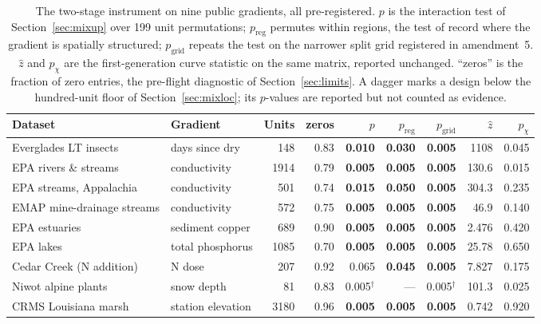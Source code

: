 \begin{table}[t]
\centering
\caption{The two-stage instrument on nine public gradients, all pre-registered. $p$ is the interaction test of Section~\ref{sec:mixup} over 199 unit permutations; $p_{\text{reg}}$ permutes within regions, the test of record where the gradient is spatially structured; $p_{\text{grid}}$ repeats the test on the narrower split grid registered in amendment~5. $\hat z$ and $p_\chi$ are the first-generation curve statistic on the same matrix, reported unchanged. ``zeros'' is the fraction of zero entries, the pre-flight diagnostic of Section~\ref{sec:limits}. A dagger marks a design below the hundred-unit floor of Section~\ref{sec:mixloc}; its $p$-values are reported but not counted as evidence.}
\label{tab:program}
\small
\begin{tabular}{llrrrrrrr}
\toprule
Dataset & Gradient & Units & zeros & $p$ & $p_{\text{reg}}$ & $p_{\text{grid}}$ & $\hat z$ & $p_\chi$ \\
\midrule
Everglades LT insects & days since dry & 148 & 0.83 & \textbf{0.010} & \textbf{0.030} & \textbf{0.005} & 1108 & 0.045 \\
EPA rivers \& streams & conductivity & 1914 & 0.79 & \textbf{0.005} & \textbf{0.005} & \textbf{0.005} & 130.6 & 0.015 \\
EPA streams, Appalachia & conductivity & 501 & 0.74 & \textbf{0.015} & \textbf{0.050} & \textbf{0.005} & 304.3 & 0.235 \\
EMAP mine-drainage streams & conductivity & 572 & 0.75 & \textbf{0.005} & \textbf{0.005} & \textbf{0.005} & 46.9 & 0.140 \\
EPA estuaries & sediment copper & 689 & 0.90 & \textbf{0.005} & \textbf{0.005} & \textbf{0.005} & 2.476 & 0.420 \\
EPA lakes & total phosphorus & 1085 & 0.70 & \textbf{0.005} & \textbf{0.005} & \textbf{0.005} & 25.78 & 0.650 \\
Cedar Creek (N addition) & N dose & 207 & 0.92 & 0.065 & \textbf{0.045} & \textbf{0.005} & 7.827 & 0.175 \\
Niwot alpine plants & snow depth & 81 & 0.83 & 0.005$^\dagger$ & --- & 0.005$^\dagger$ & 101.3 & 0.025 \\
CRMS Louisiana marsh & station elevation & 3180 & 0.96 & \textbf{0.005} & \textbf{0.005} & \textbf{0.005} & 0.742 & 0.920 \\
\bottomrule
\end{tabular}
\end{table}
